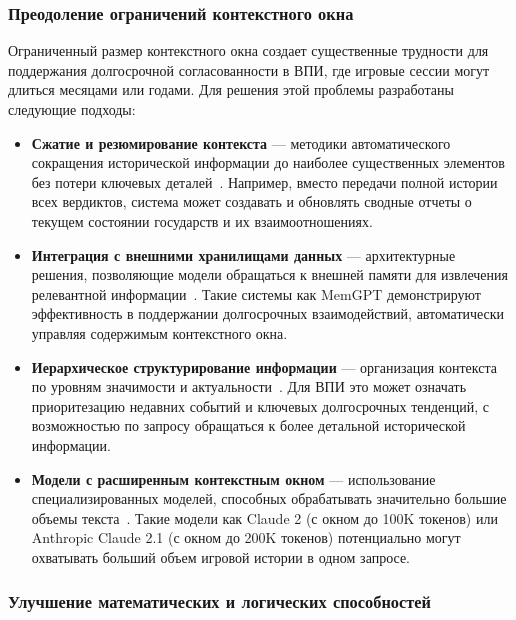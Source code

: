 \subsubsection{Преодоление ограничений контекстного окна}

Ограниченный размер контекстного окна создает существенные трудности для поддержания долгосрочной согласованности в ВПИ, где игровые сессии могут длиться месяцами или годами. Для решения этой проблемы разработаны следующие подходы:

\begin{itemize}
    \item \textbf{Сжатие и резюмирование контекста} — методики автоматического сокращения исторической информации до наиболее существенных элементов без потери ключевых деталей~\cite{zhang2023extractive}. Например, вместо передачи полной истории всех вердиктов, система может создавать и обновлять сводные отчеты о текущем состоянии государств и их взаимоотношениях.

    \item \textbf{Интеграция с внешними хранилищами данных} — архитектурные решения, позволяющие модели обращаться к внешней памяти для извлечения релевантной информации~\cite{zhong2023memgpt}. Такие системы как MemGPT демонстрируют эффективность в поддержании долгосрочных взаимодействий, автоматически управляя содержимым контекстного окна.

    \item \textbf{Иерархическое структурирование информации} — организация контекста по уровням значимости и актуальности~\cite{wu2022memorizing}. Для ВПИ это может означать приоритезацию недавних событий и ключевых долгосрочных тенденций, с возможностью по запросу обращаться к более детальной исторической информации.

    \item \textbf{Модели с расширенным контекстным окном} — использование специализированных моделей, способных обрабатывать значительно большие объемы текста~\cite{peng2023yarn}. Такие модели как Claude 2 (с окном до 100K токенов) или Anthropic Claude 2.1 (с окном до 200K токенов) потенциально могут охватывать больший объем игровой истории в одном запросе.
\end{itemize}

\subsubsection{Улучшение математических и логических способностей}


